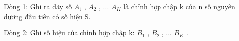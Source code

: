 Dòng 1: Ghi ra dãy số $A_{1}$   , $A_{2}$   , ... $A_{K}$   là chỉnh hợp chập k của n số nguyên dương đầu tiên có số hiệu S.  

   Dòng 2: Ghi số hiệu của chỉnh hợp chập k: $B_{1}$   , $B_{2}$   , ... $B_{K}$   .